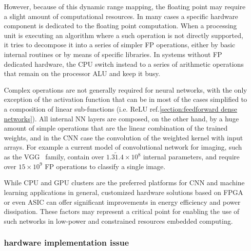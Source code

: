 
However, because of this dynamic range mapping, the floating point may require a slight amount of computational resources.
In many cases a specific hardware component is dedicated to the floating point computation. When a processing unit is executing an algorithm where a such operation is not directly supported, it tries to decompose it into a series of simpler \ac{FP} operations, either by basic internal routines or by means of specific libraries.
In systems without \ac{FP} dedicated hardware, the CPU switch instead to a series of arithmetic operations that remain on the processor \ac{ALU} and keep it busy.

Complex operations are not generally required for neural networks, with the only exception of the activation function that can be in most of the cases simplified to a composition of linear sub-functions (i.e. ReLU ref.\cref{section:feedforward dense networks}). All internal NN layers are composed, on the other hand, by a huge amount of simple operations that are the linear combination of the trained weights, and in the \acs{CNN} case the convolution of the weighted kernel with input arrays.
For example a current model of convolutional network for imaging, such as the VGG~\cite{Simonyan15} family, contain over
$1.3\tilde1.4\times10^8$ internal parameters, and require over $15\times10^9$ \ac{FP} operations to classify a single image.

While CPU and GPU clusters are the preferred platforms for \acs{CNN} and machine learning applications in general, customized hardware solutions based on \ac{FPGA} or even \ac{ASIC} can offer significant improvements in energy efficiency and power dissipation. 
These factors may represent a critical point for enabling the use of such networks in low-power and constrained resources embedded computing.

\subsubsection*{hardware implementation issue}

